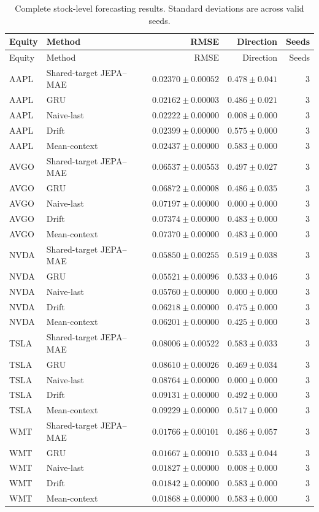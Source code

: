 \begin{longtable}{llrrr}
\caption{Complete stock-level forecasting results. Standard deviations are across valid seeds.}\label{tab:appendix_stock_metrics}\\
\toprule
Equity & Method & RMSE & Direction & Seeds \\
\midrule
\endfirsthead
\toprule
Equity & Method & RMSE & Direction & Seeds \\
\midrule
\endhead
AAPL & Shared-target JEPA--MAE & $0.02370 \pm 0.00052$ & $0.478 \pm 0.041$ & 3 \\
AAPL & GRU & $0.02162 \pm 0.00003$ & $0.486 \pm 0.021$ & 3 \\
AAPL & Naive-last & $0.02222 \pm 0.00000$ & $0.008 \pm 0.000$ & 3 \\
AAPL & Drift & $0.02399 \pm 0.00000$ & $0.575 \pm 0.000$ & 3 \\
AAPL & Mean-context & $0.02437 \pm 0.00000$ & $0.583 \pm 0.000$ & 3 \\
AVGO & Shared-target JEPA--MAE & $0.06537 \pm 0.00553$ & $0.497 \pm 0.027$ & 3 \\
AVGO & GRU & $0.06872 \pm 0.00008$ & $0.486 \pm 0.035$ & 3 \\
AVGO & Naive-last & $0.07197 \pm 0.00000$ & $0.000 \pm 0.000$ & 3 \\
AVGO & Drift & $0.07374 \pm 0.00000$ & $0.483 \pm 0.000$ & 3 \\
AVGO & Mean-context & $0.07370 \pm 0.00000$ & $0.483 \pm 0.000$ & 3 \\
NVDA & Shared-target JEPA--MAE & $0.05850 \pm 0.00255$ & $0.519 \pm 0.038$ & 3 \\
NVDA & GRU & $0.05521 \pm 0.00096$ & $0.533 \pm 0.046$ & 3 \\
NVDA & Naive-last & $0.05760 \pm 0.00000$ & $0.000 \pm 0.000$ & 3 \\
NVDA & Drift & $0.06218 \pm 0.00000$ & $0.475 \pm 0.000$ & 3 \\
NVDA & Mean-context & $0.06201 \pm 0.00000$ & $0.425 \pm 0.000$ & 3 \\
TSLA & Shared-target JEPA--MAE & $0.08006 \pm 0.00522$ & $0.583 \pm 0.033$ & 3 \\
TSLA & GRU & $0.08610 \pm 0.00026$ & $0.469 \pm 0.034$ & 3 \\
TSLA & Naive-last & $0.08764 \pm 0.00000$ & $0.000 \pm 0.000$ & 3 \\
TSLA & Drift & $0.09131 \pm 0.00000$ & $0.492 \pm 0.000$ & 3 \\
TSLA & Mean-context & $0.09229 \pm 0.00000$ & $0.517 \pm 0.000$ & 3 \\
WMT & Shared-target JEPA--MAE & $0.01766 \pm 0.00101$ & $0.486 \pm 0.057$ & 3 \\
WMT & GRU & $0.01667 \pm 0.00010$ & $0.533 \pm 0.044$ & 3 \\
WMT & Naive-last & $0.01827 \pm 0.00000$ & $0.008 \pm 0.000$ & 3 \\
WMT & Drift & $0.01842 \pm 0.00000$ & $0.583 \pm 0.000$ & 3 \\
WMT & Mean-context & $0.01868 \pm 0.00000$ & $0.583 \pm 0.000$ & 3 \\
\bottomrule
\end{longtable}
